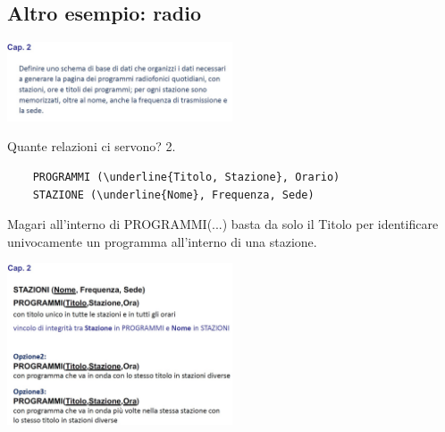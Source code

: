 \subsection{Altro esempio: radio}
\begin{center}
    \includegraphics[width=0.5\textwidth]{chaptersLezioniSara/img/MR_es_radio1.jpg}
\end{center}
Quante relazioni ci servono? 2.
\begin{verbatim}
    PROGRAMMI (\underline{Titolo, Stazione}, Orario) 
    STAZIONE (\underline{Nome}, Frequenza, Sede)
\end{verbatim}
Magari all'interno di PROGRAMMI(...) basta da solo il Titolo per identificare univocamente un programma all'interno di una stazione.
\begin{center}
    \includegraphics[width=0.5\textwidth]{chaptersLezioniSara/img/MR_es_radio2.jpg}
\end{center}

